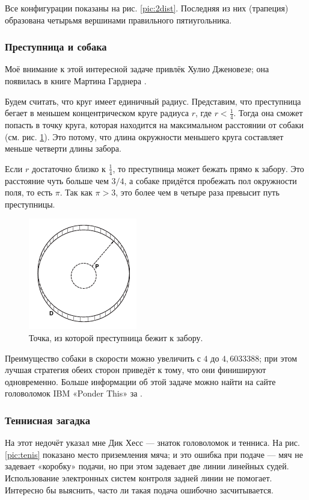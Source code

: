 Все конфигурации показаны на рис. \ref{pic:2dist}.
Последняя из них (трапеция) образована четырьмя вершинами правильного пятиугольника.


\subsubsection*{Преступница и собака}

Моё внимание к этой интересной задаче привлёк Хулио Дженовезе;
она появилась в книге Мартина Гарднера \cite{24}.

Будем считать, что круг имеет единичный радиус.
Представим, что преступница бегает в меньшем концентрическом круге радиуса $r$, где $r < \tfrac14$.
Тогда она сможет попасть в точку круга, которая находится на максимальном расстоянии от собаки (см. рис. \ref{pic:dog}).
Это потому, что длина окружности меньшего круга составляет меньше четверти длины забора.

Если $r$ достаточно близко к $\tfrac14$, то преступница может бежать прямо к забору.
Это расстояние чуть больше чем $3/4$, а собаке придётся пробежать пол окружности поля, то есть $\pi$.
Так как $\pi > 3$, это более чем в четыре раза превысит путь преступницы.

\begin{figure}[h!]
\centering
\includegraphics[scale=1]{pics/dog}
\caption{Точка, из которой преступница бежит к забору.}
\label{pic:dog}
\end{figure}

Преимущество собаки в скорости можно увеличить с $4$ до $4{,}6033388$; при этом лучшая стратегия обеих сторон приведёт к тому, что они финишируют одновременно.
Больше информации об этой задаче  можно найти на сайте головоломок IBM «Ponder This» за \cite[май 2001]{ponder-this}.

\subsubsection*{Теннисная загадка}

На этот недочёт указал мне Дик Хесс --- знаток головоломок и тенниса.
На рис. \ref{pic:tenis} показано место приземления мяча; и это ошибка при подаче --- мяч не задевает «коробку» подачи, но при этом задевает две линии линейных судей. 
Использование электронных систем контроля задней линии не помогает.
Интересно бы выяснить, часто ли такая подача ошибочно засчитывается.

